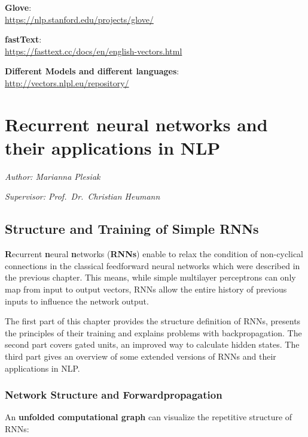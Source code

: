 \documentclass[]{krantz}
\begin{document}
\textbf{Glove}:\\
\url{https://nlp.stanford.edu/projects/glove/}

\textbf{fastText}:\\
\url{https://fasttext.cc/docs/en/english-vectors.html}

\textbf{Different Models and different languages}:\\
\url{http://vectors.nlpl.eu/repository/}

\hypertarget{recurrent-neural-networks-and-their-applications-in-nlp}{%
\chapter{Recurrent neural networks and their applications in NLP}\label{recurrent-neural-networks-and-their-applications-in-nlp}}

\emph{Author: Marianna Plesiak}

\emph{Supervisor: Prof.~Dr.~Christian Heumann}

\hypertarget{structure-and-training-of-simple-rnns}{%
\section{Structure and Training of Simple RNNs}\label{structure-and-training-of-simple-rnns}}

\textbf{R}ecurrent \textbf{n}eural \textbf{n}etworks (\textbf{RNNs}) enable to relax the condition of non-cyclical connections in the classical feedforward neural networks which were described in the previous chapter. This means, while simple multilayer perceptrons can only map from input to output vectors, RNNs allow the entire history of previous inputs to influence the network output. \citep{graves2013generating}

The first part of this chapter provides the structure definition of RNNs, presents the principles of their training and explains problems with backpropagation. The second part covers gated units, an improved way to calculate hidden states. The third part gives an overview of some extended versions of RNNs and their applications in NLP.

\hypertarget{network-structure-and-forwardpropagation}{%
\subsection{Network Structure and Forwardpropagation}\label{network-structure-and-forwardpropagation}}

An \textbf{unfolded computational graph} can visualize the repetitive structure of RNNs:
\end{document}
